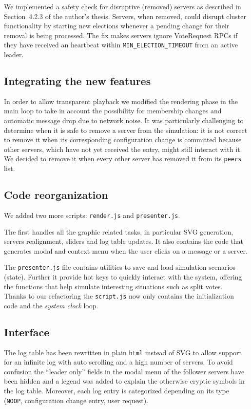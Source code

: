 We implemented a safety check for disruptive (removed) servers as described
in Section~4.2.3 of the author's thesis.
Servers, when removed, could disrupt cluster functionality by starting new
elections whenever a pending change for their removal
is being processed. The fix makes servers ignore VoteRequest RPCs if they have received an heartbeat within
\texttt{MIN\_ELECTION\_TIMEOUT} from an active leader.

\subsection{Integrating the new features}
In order to allow transparent playback we modified the rendering phase in the main loop to take in account the possibility for
membership changes and automatic message drop due to network noise.
It was particularly challenging to determine when it is safe to remove a server
from the simulation: it is not correct to remove it when its corresponding configuration change is committed because
other servers, which have not yet received the entry, might still interact with it.
We decided to remove it when every other server has removed it from its \texttt{peers} list.

\subsection{Code reorganization}
We added two more scripts: \texttt{render.js} and \texttt{presenter.js}.

The first handles all the graphic related tasks, in particular SVG generation,
servers realignment, sliders and log table updates.
It also contains the code that generates modal and context menu when
the user clicks on a message or a server.

The \texttt{presenter.js} file contains utilities to save and load simulation scenarios (state).
Further it provide hot keys to quickly interact with the system, offering the
functions that help simulate interesting situations such as split votes.\\

Thanks to our refactoring the \texttt{script.js} now only contains the
initialization code and the \emph{system clock} loop.


\subsection{Interface}
The log table has been rewritten in plain \texttt{html} instead of SVG
to allow support for an infinite log with auto scrolling and a high number of servers.
To avoid confusion the ``leader only'' fields in the modal menu of the
follower servers have been hidden and a legend was added to explain the
otherwise cryptic symbols in the log table. Moreover, each log entry
is categorized depending on its type (\texttt{NOOP}, configuration change entry, user request).

